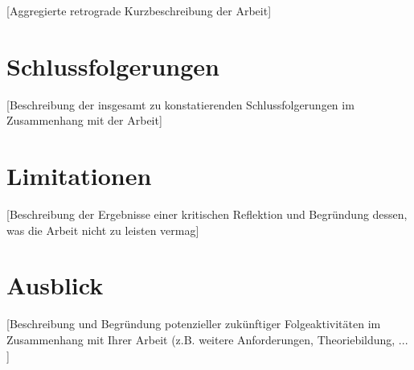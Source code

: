 [Aggregierte retrograde Kurzbeschreibung der Arbeit]
\section{Schlussfolgerungen}
 [Beschreibung der insgesamt zu konstatierenden Schlussfolgerungen im Zusammenhang mit der Arbeit]
\section{Limitationen}
 [Beschreibung der Ergebnisse einer kritischen Reflektion und Begr\"undung dessen, was die Arbeit nicht zu leisten vermag]
\section{Ausblick}
 [Beschreibung und Begr\"undung potenzieller zuk\"unftiger Folgeaktivit\"aten im Zusammenhang mit Ihrer Arbeit (z.B. weitere Anforderungen, Theoriebildung, ... ]
